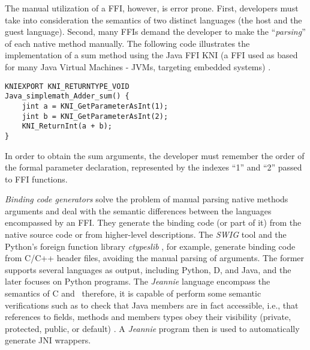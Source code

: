 The manual utilization of a FFI, however, is error prone.
First, developers
must take into consideration the semantics of two distinct languages
(the host and the guest language).
Second, many FFIs
demand
the developer to make the ``\emph{parsing}'' of each native method manually.
The following code illustrates the implementation of a sum method using the
Java FFI KNI
(a FFI used as based for many Java Virtual Machines - JVMs, targeting embedded systems)
\cite{_k_2002}.
% 
\begin{verbatim}
KNIEXPORT KNI_RETURNTYPE_VOID
Java_simplemath_Adder_sum() {
    jint a = KNI_GetParameterAsInt(1);
    jint b = KNI_GetParameterAsInt(2);
    KNI_ReturnInt(a + b);
}
\end{verbatim}
% 
In order to obtain the sum arguments, the developer must remember the order
of the formal parameter declaration, represented by the indexes ``1'' and ``2''
passed to FFI functions.

% 
% 
\emph{Binding code generators} solve the problem of manual parsing native methods
arguments and deal with the semantic differences between the languages
encompassed by an FFI.
They generate the binding code (or part of it) from the
native source code or from higher-level descriptions.
% 
The \textit{SWIG} \cite{swig-site} tool and the
Python's foreign function library \emph{ctypeslib} \cite{ctypeslib-site},
for example, generate binding code from C/C++ header files,
avoiding the manual parsing of arguments.
The former supports several languages as output, including Python, D,
and Java, and the later focuses on Python programs.
The \emph{Jeannie} language encompass the semantics of C and \java~therefore, it
is capable of perform some semantic verifications such as to check that Java members are in
fact accessible, i.e., that references to fields, methods and members types obey
their visibility (private, protected, public, or default) \cite{1297030}.
A \emph{Jeannie} program then is used to automatically generate JNI wrappers.

